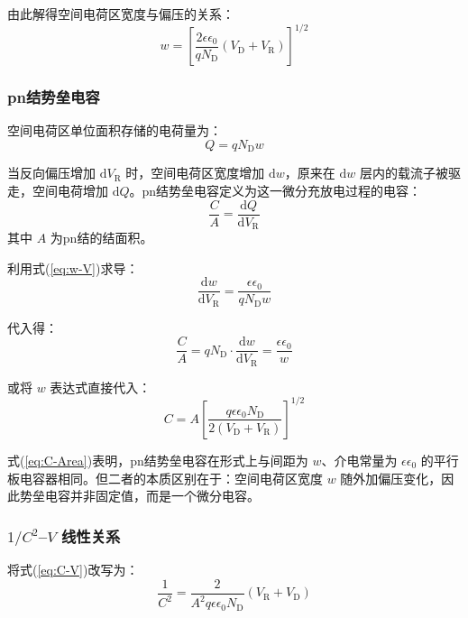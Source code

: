由此解得空间电荷区宽度与偏压的关系：
\begin{equation}\label{eq:w-V}
w = \left[\frac{2\epsilon\epsilon_0}{qN_{\mathrm{D}}}(V_{\mathrm{D}} + V_{\mathrm{R}})\right]^{1/2}
\end{equation}

\subsubsection{pn结势垒电容}

空间电荷区单位面积存储的电荷量为：
\begin{equation}
Q = qN_{\mathrm{D}}w
\end{equation}

当反向偏压增加 $\mathrm{d}V_{\mathrm{R}}$ 时，空间电荷区宽度增加 $\mathrm{d}w$，原来在 $\mathrm{d}w$ 层内的载流子被驱走，空间电荷增加 $\mathrm{d}Q$。pn结势垒电容定义为这一微分充放电过程的电容：
\begin{equation}
\frac{C}{A} = \frac{\mathrm{d}Q}{\mathrm{d}V_{\mathrm{R}}}
\end{equation}
其中 $A$ 为pn结的结面积。

利用式(\ref{eq:w-V})求导：
\begin{equation}
\frac{\mathrm{d}w}{\mathrm{d}V_{\mathrm{R}}} = \frac{\epsilon\epsilon_0}{qN_{\mathrm{D}}w}
\end{equation}

代入得：
\begin{equation}\label{eq:C-Area}
\frac{C}{A} = qN_{\mathrm{D}} \cdot \frac{\mathrm{d}w}{\mathrm{d}V_{\mathrm{R}}} = \frac{\epsilon\epsilon_0}{w}
\end{equation}

或将 $w$ 表达式直接代入：
\begin{equation}\label{eq:C-V}
C = A\left[\frac{q\epsilon\epsilon_0 N_{\mathrm{D}}}{2(V_{\mathrm{D}} + V_{\mathrm{R}})}\right]^{1/2}
\end{equation}

式(\ref{eq:C-Area})表明，pn结势垒电容在形式上与间距为 $w$、介电常量为 $\epsilon\epsilon_0$ 的平行板电容器相同。但二者的本质区别在于：空间电荷区宽度 $w$ 随外加偏压变化，因此势垒电容并非固定值，而是一个微分电容。

\subsubsection{$1/C^2$--$V$ 线性关系}

将式(\ref{eq:C-V})改写为：
\begin{equation}\label{eq:1C2-V}
\frac{1}{C^{2}} = \frac{2}{A^{2}q\epsilon\epsilon_0 N_{\mathrm{D}}}(V_{\mathrm{R}} + V_{\mathrm{D}})
\end{equation}

